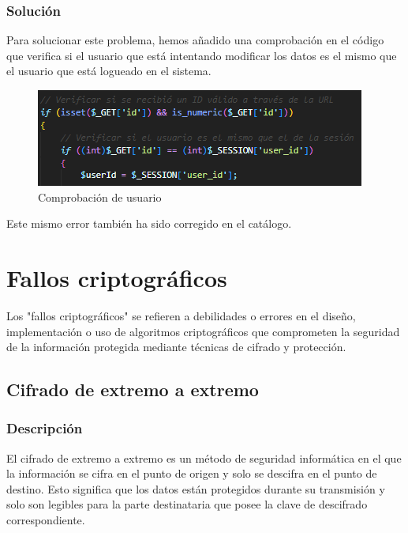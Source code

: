 \documentclass{report}
\begin{document}
                \subsubsection{Solución}
                    Para solucionar este problema, hemos añadido una comprobación en el código que verifica si el usuario que está intentando modificar los datos es el mismo que el usuario que está logueado en el sistema.
                    \begin{figure}[H]
                        \centering
                        \includegraphics[width=\textwidth]{./img/vulnerabilidades/3.1/1.4.png}
                        \caption{Comprobación de usuario}
                    \end{figure}
                    Este mismo error también ha sido corregido en el catálogo.
            \clearpage       
        \section{Fallos criptográficos}
            Los "fallos criptográficos" se refieren a debilidades o errores en el diseño, implementación o uso de algoritmos criptográficos que comprometen la seguridad de la información protegida mediante técnicas de cifrado y protección.
            \subsection{Cifrado de extremo a extremo}
                \subsubsection{Descripción}
                    El cifrado de extremo a extremo es un método de seguridad informática en el que la información se cifra en el punto de origen y solo se descifra en el punto de destino. Esto significa que los datos están protegidos durante su transmisión y solo son legibles para la parte destinataria que posee la clave de descifrado correspondiente.
\end{document}
